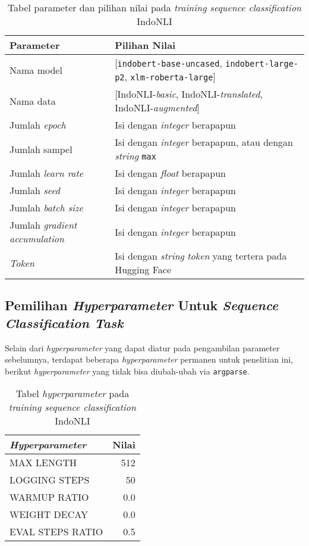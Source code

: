 \begin{table}[H]
\centering
\begin{tabularx}{\linewidth}{lX}
 \toprule
 Parameter & Pilihan Nilai \\
 \midrule
 Nama model & [\texttt{indobert-base-uncased}, \texttt{indobert-large-p2}, \texttt{xlm-roberta-large}] \\  
 Nama data & [IndoNLI-\emph{basic}, IndoNLI-\emph{translated}, IndoNLI-\emph{augmented}] \\
 Jumlah \emph{epoch} & Isi dengan \emph{integer} berapapun \\
 Jumlah sampel & Isi dengan \emph{integer} berapapun, atau dengan \emph{string} \texttt{max} \\
 Jumlah \emph{learn rate} & Isi dengan \emph{float} berapapun \\ 
 Jumlah \emph{seed} & Isi dengan \emph{integer} berapapun \\ 
 Jumlah \emph{batch size} & Isi dengan \emph{integer} berapapun \\ 
 Jumlah \emph{gradient accumulation} & Isi dengan \emph{integer} berapapun \\ 
 \emph{Token} & Isi dengan \emph{string} \emph{token} yang tertera pada Hugging Face \\ 
 \bottomrule
\end{tabularx}
\caption{Tabel parameter dan pilihan nilai pada \emph{training sequence classification} IndoNLI}
\end{table}

\subsection{Pemilihan \emph{Hyperparameter} Untuk \emph{Sequence Classification Task}}
\label{4.1.2}
Selain dari \emph{hyperparameter} yang dapat diatur pada pengambilan parameter sebelumnya, terdapat beberapa \emph{hyperparameter} permanen untuk penelitian ini, berikut \emph{hyperparameter} yang tidak bisa diubah-ubah via \texttt{argparse}.

\begin{table}[h]
\centering
\begin{tabular}{lr} 
 \toprule
 \emph{Hyperparameter} & Nilai \\ [0.5ex] 
 \midrule
 MAX LENGTH & 512 \\ 
 LOGGING STEPS & 50 \\
 WARMUP RATIO & 0.0 \\
 WEIGHT DECAY & 0.0 \\ 
 EVAL STEPS RATIO & 0.5 \\ [1ex] 
 \bottomrule
\end{tabular}
\caption{Tabel \emph{hyperparameter} pada \emph{training sequence classification} IndoNLI}
\end{table}

